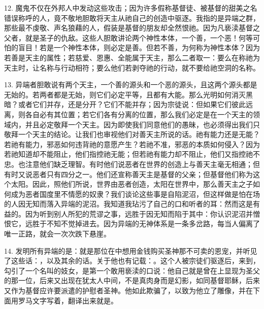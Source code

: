\par

12. 魔鬼不仅在外邦人中发动这些攻击；因为许多假称基督徒、被基督的甜美之名错误称呼的人，竟不敬地胆敢将天主从祂自己的创造中驱逐。我指的是异端之群，那些最不虔敬、声名狼藉的人，假装是基督的朋友却全然恨祂。因为凡亵渎基督之父者，就是圣子的仇敌。这些人胆敢讲论两个神性本体，一个善，一个恶！何等可怕的盲目！若是一个神性本体，则必定是善。但若不善，为何称为神性本体？因为若善是天主的属性；若慈爱、恩惠、全能属于天主，那么二者取一：要么在称祂为天主时，让名称与行动相符；要么他们若剥夺祂的行动，就不要给祂空洞的名称。\par

13. 异端者胆敢说有两个天主，一个善的源头和一个恶的源头，且这两个源头都是无始的。若两者都是无始，则它们必定平等，且都有大能。那么光明如何消灭黑暗？或者它们并存，还是分开？它们不能并存；因为宗徒说：但如果它们彼此远离，则各自必有其位置；若它们各有分离的位置，那么我们必定是在一个天主的领域内，并且必定敬拜一个天主。因为即使我们同意他们的愚昧，也必须得出我们只敬拜一个天主的结论。让我们也审视他们对善天主所说的话。祂有能力还是无能？若祂有能力，邪恶如何违背祂的意愿产生？若祂不准，邪恶的本质如何侵入？因为若祂知道却不能阻止，他们指控祂无能；但若祂有能力却不阻止，他们又指控祂不忠。也注意他们缺乏理智。有时他们说恶者在世界的创造上与善天主毫无相通；但有时又说恶者只有四分之一。他们还宣称善天主是基督的父亲；但基督他们称为这个太阳。因此，照他们所说，世界由恶者创造，太阳在世界中，那么善天主之子如何成为恶者国度里不情愿的奴隶？我们谈论这些事是自陷泥沼，但这样做是怕在场的人因无知而落入异端的泥沼。我知道我玷污了自己的口和听者的耳：然而这是有益的。因为听到别人所犯的荒谬之事，远胜于因无知而陷于其中：你认识泥沼并憎恨它，远胜于不知不觉掉进去。因为异端的无神体系是一条多岔路，每当人偏离了唯一正路，就会一次次跌下悬崖。\par

14. 发明所有异端的是：就是那位在中想用金钱购买圣神那不可卖的恩宠，并听见了这些话：，以及其余的话。关于他也有记载：。这个人被宗徒们驱逐后，来到，勾引了一个名叫的妓女，是第一个敢用亵渎的口说：他自己就是曾在上显现为圣父的那一位，后来又出现在犹太人中间，不是真肉身而是幻影，如同基督耶稣，后来又作为基督应许要派遣的护慰者圣神。他如此欺骗了，以致为他立了雕像，并在下面用罗马文字写着，翻译出来就是。\par

